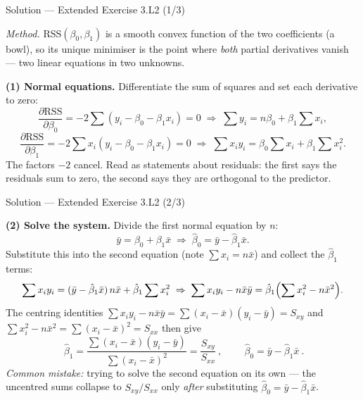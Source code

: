 \documentclass[aspectratio=169,11pt]{beamer}
\begin{document}
\begin{frame}{Solution --- Extended Exercise 3.L2 (1/3)}
  \begin{solutionbox}
    \emph{Method.} $\mathrm{RSS}(\beta_0,\beta_1)$ is a smooth convex
    function of the two coefficients (a bowl), so its unique minimiser
    is the point where \emph{both} partial derivatives vanish --- two
    linear equations in two unknowns.

    \textbf{(1) Normal equations.} Differentiate the sum of squares and
    set each derivative to zero:
    \[
      \frac{\partial \mathrm{RSS}}{\partial \beta_0}
        =-2\sum (y_i-\beta_0-\beta_1 x_i)=0
        \;\Rightarrow\; \sum y_i=n\beta_0+\beta_1\sum x_i,
    \]
    \[
      \frac{\partial \mathrm{RSS}}{\partial \beta_1}
        =-2\sum x_i(y_i-\beta_0-\beta_1 x_i)=0
        \;\Rightarrow\; \sum x_i y_i=\beta_0\sum x_i+\beta_1\sum x_i^2.
    \]
    The factors $-2$ cancel. Read as statements about residuals: the
    first says the residuals sum to zero, the second says they are
    orthogonal to the predictor.
  \end{solutionbox}
\end{frame}

\begin{frame}{Solution --- Extended Exercise 3.L2 (2/3)}
  \begin{solutionbox}
    \textbf{(2) Solve the system.} Divide the first normal equation by
    $n$:
    \[
      \bar y=\beta_0+\beta_1\bar x
      \;\Rightarrow\; \hat\beta_0=\bar y-\hat\beta_1\bar x.
    \]
    Substitute this into the second equation (note
    $\sum x_i=n\bar x$) and collect the $\hat\beta_1$ terms:
    \[
      \sum x_i y_i=(\bar y-\hat\beta_1\bar x)\,n\bar x+\hat\beta_1\sum x_i^2
      \;\Rightarrow\;
      \sum x_i y_i-n\bar x\bar y
        =\hat\beta_1\Bigl(\sum x_i^2-n\bar x^2\Bigr).
    \]
    The centring identities
    $\sum x_i y_i-n\bar x\bar y=\sum(x_i-\bar x)(y_i-\bar y)=S_{xy}$ and
    $\sum x_i^2-n\bar x^2=\sum(x_i-\bar x)^2=S_{xx}$ then give
    \[
      \boxed{\ \hat\beta_1=\dfrac{\sum(x_i-\bar x)(y_i-\bar y)}{\sum(x_i-\bar x)^2}
      =\dfrac{S_{xy}}{S_{xx}}\ },\qquad
      \boxed{\ \hat\beta_0=\bar y-\hat\beta_1\bar x\ }.
    \]
    \textit{Common mistake:} trying to solve the second equation on its
    own --- the uncentred sums collapse to $S_{xy}/S_{xx}$ only
    \emph{after} substituting $\hat\beta_0=\bar y-\hat\beta_1\bar x$.
  \end{solutionbox}
\end{frame}
\end{document}
